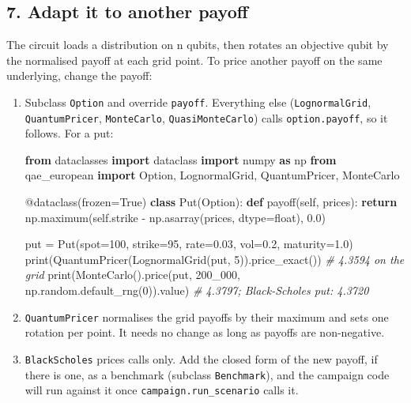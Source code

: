 \documentclass[
  10pt,
]{article}
\newenvironment{Shaded}{}{}
\newcommand{\AttributeTok}[1]{\textcolor[rgb]{0.49,0.56,0.16}{#1}}
\newcommand{\BuiltInTok}[1]{\textcolor[rgb]{0.00,0.50,0.00}{#1}}
\newcommand{\CommentTok}[1]{\textcolor[rgb]{0.38,0.63,0.69}{\textit{#1}}}
\newcommand{\ControlFlowTok}[1]{\textcolor[rgb]{0.00,0.44,0.13}{\textbf{#1}}}
\newcommand{\DecValTok}[1]{\textcolor[rgb]{0.25,0.63,0.44}{#1}}
\newcommand{\FloatTok}[1]{\textcolor[rgb]{0.25,0.63,0.44}{#1}}
\newcommand{\ImportTok}[1]{\textcolor[rgb]{0.00,0.50,0.00}{\textbf{#1}}}
\newcommand{\KeywordTok}[1]{\textcolor[rgb]{0.00,0.44,0.13}{\textbf{#1}}}
\newcommand{\NormalTok}[1]{#1}
\newcommand{\OperatorTok}[1]{\textcolor[rgb]{0.40,0.40,0.40}{#1}}
\newcommand{\VariableTok}[1]{\textcolor[rgb]{0.10,0.09,0.49}{#1}}
\begin{document}
\hypertarget{7-adapt-it-to-another-payoff}{%
\subsection{7. Adapt it to another
payoff}\label{7-adapt-it-to-another-payoff}}

The circuit loads a distribution on n qubits, then rotates an objective
qubit by the normalised payoff at each grid point. To price another
payoff on the same underlying, change the payoff:

\begin{enumerate}
\def\labelenumi{\arabic{enumi}.}
\item
  Subclass \texttt{Option} and override \texttt{payoff}. Everything else
  (\texttt{LognormalGrid}, \texttt{QuantumPricer}, \texttt{MonteCarlo},
  \texttt{QuasiMonteCarlo}) calls \texttt{option.payoff}, so it follows.
  For a put:

\begin{Shaded}
\begin{Highlighting}[]
\ImportTok{from}\NormalTok{ dataclasses }\ImportTok{import}\NormalTok{ dataclass}
\ImportTok{import}\NormalTok{ numpy }\ImportTok{as}\NormalTok{ np}
\ImportTok{from}\NormalTok{ qae\_european }\ImportTok{import}\NormalTok{ Option, LognormalGrid, QuantumPricer, MonteCarlo}

\AttributeTok{@dataclass}\NormalTok{(frozen}\OperatorTok{=}\VariableTok{True}\NormalTok{)}
\KeywordTok{class}\NormalTok{ Put(Option):}
    \KeywordTok{def}\NormalTok{ payoff(}\VariableTok{self}\NormalTok{, prices):}
        \ControlFlowTok{return}\NormalTok{ np.maximum(}\VariableTok{self}\NormalTok{.strike }\OperatorTok{{-}}\NormalTok{ np.asarray(prices, dtype}\OperatorTok{=}\BuiltInTok{float}\NormalTok{), }\FloatTok{0.0}\NormalTok{)}

\NormalTok{put }\OperatorTok{=}\NormalTok{ Put(spot}\OperatorTok{=}\DecValTok{100}\NormalTok{, strike}\OperatorTok{=}\DecValTok{95}\NormalTok{, rate}\OperatorTok{=}\FloatTok{0.03}\NormalTok{, vol}\OperatorTok{=}\FloatTok{0.2}\NormalTok{, maturity}\OperatorTok{=}\FloatTok{1.0}\NormalTok{)}
\BuiltInTok{print}\NormalTok{(QuantumPricer(LognormalGrid(put, }\DecValTok{5}\NormalTok{)).price\_exact())                    }\CommentTok{\# 4.3594 on the grid}
\BuiltInTok{print}\NormalTok{(MonteCarlo().price(put, }\DecValTok{200\_000}\NormalTok{, np.random.default\_rng(}\DecValTok{0}\NormalTok{)).value)     }\CommentTok{\# 4.3797; Black{-}Scholes put: 4.3720}
\end{Highlighting}
\end{Shaded}
\item
  \texttt{QuantumPricer} normalises the grid payoffs by their maximum
  and sets one rotation per point. It needs no change as long as payoffs
  are non-negative.
\item
  \texttt{BlackScholes} prices calls only. Add the closed form of the
  new payoff, if there is one, as a benchmark (subclass
  \texttt{Benchmark}), and the campaign code will run against it once
  \texttt{campaign.run\_scenario} calls it.
\end{enumerate}
\end{document}
